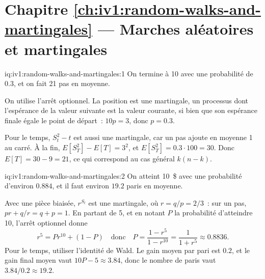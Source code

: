 \section*{Chapitre \ref{ch:iv1:random-walks-and-martingales} --- Marches aléatoires et martingales}

\begin{solution}{iq:iv1:random-walks-and-martingales:1}
On termine à 10 avec une probabilité de $0.3$, et on fait 21 pas en moyenne.

On utilise l'arrêt optionnel. La position est une martingale, un processus dont l'espérance de la valeur suivante est la valeur courante, si bien que son espérance finale égale le point de départ~: $10p = 3$, donc $p = 0.3$.

Pour le temps, $S_t^2 - t$ est aussi une martingale, car un pas ajoute en moyenne 1 au carré. À la fin, $E[S_T^2] - E[T] = 3^2$, et $E[S_T^2] = 0.3 \cdot 100 = 30$. Donc $E[T] = 30 - 9 = 21$, ce qui correspond au cas général $k(n - k)$.

\end{solution}

\begin{solution}{iq:iv1:random-walks-and-martingales:2}
On atteint 10~\$ avec une probabilité d'environ $0.884$, et il faut environ $19.2$ paris en moyenne.

Avec une pièce biaisée, $r^{S_t}$ est une martingale, où $r = q/p = 2/3$~: sur un pas, $p r + q/r = q + p = 1$. En partant de 5, et en notant $P$ la probabilité d'atteindre 10, l'arrêt optionnel donne
\[
r^5 = P r^{10} + (1 - P) \quad\text{donc}\quad P = \frac{1 - r^5}{1 - r^{10}} = \frac{1}{1 + r^5} \approx 0.8836.
\]
Pour le temps, utiliser l'identité de Wald. Le gain moyen par pari est $0.2$, et le gain final moyen vaut $10P - 5 \approx 3.84$, donc le nombre de paris vaut $3.84/0.2 \approx 19.2$.

\end{solution}

